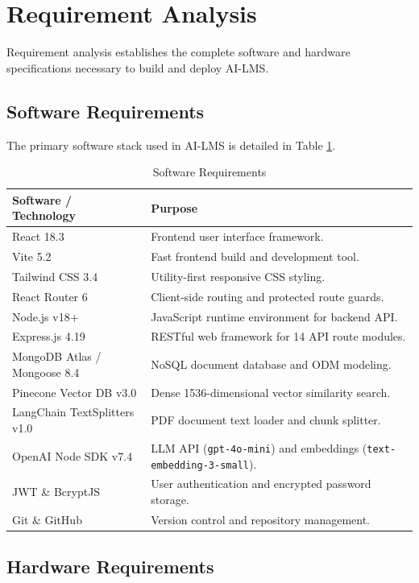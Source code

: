 \section{Requirement Analysis}

Requirement analysis establishes the complete software and hardware specifications necessary to build and deploy AI-LMS.

\subsection{Software Requirements}

The primary software stack used in AI-LMS is detailed in Table \ref{tab:sw_req}.

\begin{table}[H]
\centering
\caption{Software Requirements}
\label{tab:sw_req}
\begin{tabular}{p{} p{}}
\toprule
\textbf{Software / Technology} & \textbf{Purpose} \\
\midrule
React 18.3 & Frontend user interface framework. \\
Vite 5.2 & Fast frontend build and development tool. \\
Tailwind CSS 3.4 & Utility-first responsive CSS styling. \\
React Router 6 & Client-side routing and protected route guards. \\
Node.js v18+ & JavaScript runtime environment for backend API. \\
Express.js 4.19 & RESTful web framework for 14 API route modules. \\
MongoDB Atlas / Mongoose 8.4 & NoSQL document database and ODM modeling. \\
Pinecone Vector DB v3.0 & Dense 1536-dimensional vector similarity search. \\
LangChain TextSplitters v1.0 & PDF document text loader and chunk splitter. \\
OpenAI Node SDK v7.4 & LLM API (\texttt{gpt-4o-mini}) and embeddings (\texttt{text-embedding-3-small}). \\
JWT \& BcryptJS & User authentication and encrypted password storage. \\
Git \& GitHub & Version control and repository management. \\
\bottomrule
\end{tabular}
\end{table}

\subsection{Hardware Requirements}

